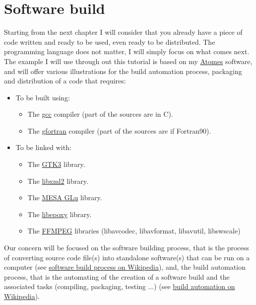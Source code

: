 \documentclass{./these-seb}
\begin{document}
\newpage

\section*{Software build}

Starting from the next chapter I will consider that you already have a piece of code written and ready to be used, even ready to be distributed. 
The programming language does not matter, I will simply focus on what comes next. \\[0.25cm]
The example I will use through out this tutorial is based on my \href{https://atomes.ipcms.fr}{Atomes} software, 
and will offer various illustrations for the build automation process, packaging and distribution of a code that requires: 
\begin{itemize}
\item To be built using:
\begin{itemize}
\item The \href{https://www.gnu.org/software/gcc/}{gcc} compiler (part of the sources are in C).
\item The \href{https://gcc.gnu.org/wiki/GFortran}{gfortran} compiler (part of the sources are if Fortran90).
\end{itemize}
\item To be linked with:
\begin{itemize}
\item The \href{https://www.gtk.org/}{GTK3} library.
\item The \href{http://xmlsoft.org/}{libxml2} library.
\item The \href{https://gitlab.freedesktop.org/mesa/glu}{MESA GLu} library.
\item The \href{https://github.com/anholt/libepoxy}{libepoxy} library.
\item The \href{https://ffmpeg.org}{FFMPEG} libraries (libavcodec, libavformat, libavutil, libswscale)
\end{itemize}
\end{itemize}
\vspace{0.25cm}
\noindent Our concern will be focused on the software building process, that is the process of converting source code file(s) into standalone software(s) 
that can be run on a computer (see \href{https://en.wikipedia.org/wiki/Software\_build}{software build process on Wikipedia}), and, 
the build automation process, that is the automating of the creation of a software build and the associated tasks (compiling, packaging, testing ...) (see \href{https://en.wikipedia.org/wiki/Build\_automation}{build automation on Wikipedia}).  
\end{document}
